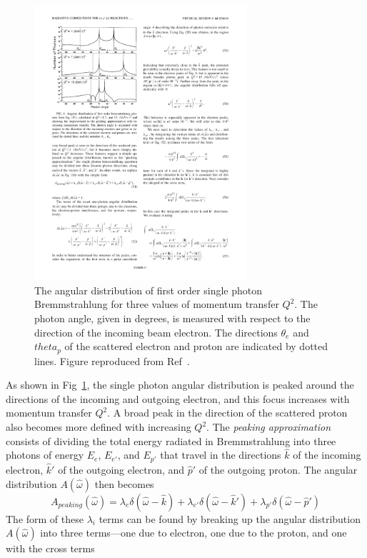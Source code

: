 \begin{figure}[!h]
    \centering
    \includegraphics[width=0.7\textwidth]{chap1/single_photon_angular_distribution.pdf}
    \caption{The angular distribution of first order single photon
             Bremmstrahlung for three values of momentum transfer $Q^2$.
             The photon angle, given in degrees, is measured with respect to
             the direction of the incoming beam electron.
             The directions $\theta_e$ and $theta_p$ of the scattered electron
             and proton are indicated by dotted lines.
             Figure reproduced from Ref~\cite{Ent_2001}.
             }
    \label{fig:single_photon_angular_distribution}
\end{figure}

As shown in Fig~\ref{fig:single_photon_angular_distribution}, the single
photon angular distribution is peaked around the directions of the incoming and
outgoing electron, and this focus increases with momentum transfer $Q^2$.
A broad peak in the direction of the scattered proton also becomes more defined
with increasing $Q^2$.
The \textit{peaking approximation} consists of dividing the total energy
radiated in Bremmstrahlung into three photons of energy $E_e$, $E_{e'}$, and
$E_{p'}$ that travel in the directions
$\hat{k}$ of the incoming electron,
$\hat{k}'$ of the outgoing electron,
and
$\hat{p}'$ of the outgoing proton.
The angular distribution $A(\hat{\omega})$ then becomes
\begin{equation}
    A_{peaking}(\hat{\omega}) = \lambda_{e}  \delta(\hat{\omega}-\hat{k}) +
                                \lambda_{e'} \delta(\hat{\omega}-\hat{k}') +
                                \lambda_{p'} \delta(\hat{\omega}-\hat{p}')
\end{equation}
The form of these $\lambda_i$ terms can be found by breaking up the angular
distribution $A(\hat{\omega})$ into three terms---one due to electron, one
due to the proton, and one with the cross terms


